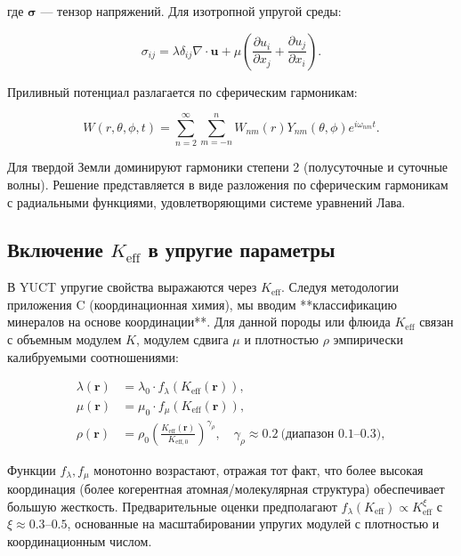 \documentclass[12pt,a4paper]{article}
\theoremstyle{remark}
\newcommand{\Keff}{K_{\mathrm{eff}}}
\newcommand{\Keffzero}{K_{\mathrm{eff},0}}
\begin{document}
	где $\boldsymbol{\sigma}$ — тензор напряжений. Для изотропной упругой среды:
	
	\begin{equation}
		\sigma_{ij} = \lambda \delta_{ij} \nabla \cdot \mathbf{u} + \mu \left(\frac{\partial u_i}{\partial x_j} + \frac{\partial u_j}{\partial x_i}\right).
		\label{eq:stress}
	\end{equation}
	
	Приливный потенциал разлагается по сферическим гармоникам:
	
	\begin{equation}
		W(r,\theta,\phi,t) = \sum_{n=2}^{\infty} \sum_{m=-n}^{n} W_{nm}(r) Y_{nm}(\theta,\phi) e^{i\omega_{nm}t}.
		\label{eq:tidal-potential}
	\end{equation}
	
	Для твердой Земли доминируют гармоники степени 2 (полусуточные и суточные волны). Решение представляется в виде разложения по сферическим гармоникам с радиальными функциями, удовлетворяющими системе уравнений Лава.
	
	\subsection{Включение $\Keff$ в упругие параметры}
	
	В YUCT упругие свойства выражаются через $\Keff$. Следуя методологии приложения C (координационная химия), мы вводим **классификацию минералов на основе координации**. Для данной породы или флюида $\Keff$ связан с объемным модулем $K$, модулем сдвига $\mu$ и плотностью $\rho$ эмпирически калибруемыми соотношениями:
	
	\begin{align}
		\lambda(\mathbf{r}) &= \lambda_0 \cdot f_\lambda(\Keff(\mathbf{r})), \\
		\mu(\mathbf{r}) &= \mu_0 \cdot f_\mu(\Keff(\mathbf{r})), \\
		\rho(\mathbf{r}) &= \rho_0 \left(\frac{\Keff(\mathbf{r})}{\Keffzero}\right)^{\gamma_\rho}, \quad \gamma_\rho \approx 0.2\ \text{(диапазон 0.1–0.3)},
		\label{eq:keff-properties}
	\end{align}
	
	Функции $f_\lambda, f_\mu$ монотонно возрастают, отражая тот факт, что более высокая координация (более когерентная атомная/молекулярная структура) обеспечивает большую жесткость. Предварительные оценки предполагают $f_\lambda(\Keff) \propto \Keff^{\xi}$ с $\xi \approx 0.3$–$0.5$, основанные на масштабировании упругих модулей с плотностью и координационным числом.
	
\end{document}
